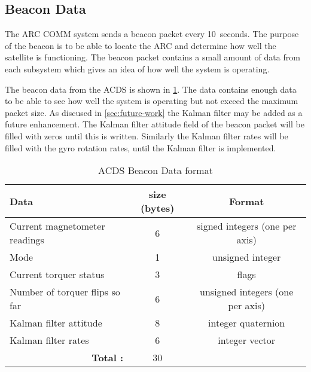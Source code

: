 \subsection{Beacon Data}

The \ac{ARC} \ac{COMM} system sends a beacon packet every 10~seconds. The purpose of the beacon is to be able to locate the \ac{ARC} and determine how well the satellite is functioning. The beacon packet contains a small amount of data from each subsystem which gives an idea of how well the system is operating.

The beacon data from the \ac{ACDS} is shown in \cref{tab:beacondat}. The data contains enough data to be able to see how well the system is operating but not exceed the maximum packet size. As discused in \cref{sec:future-work} the Kalman filter may be added as a future enhancement. The Kalman filter attitude field of the beacon packet will be filled with zeros until this is written. Similarly the Kalman filter rates will be filled with the gyro rotation rates, until the Kalman filter is implemented.

\begin{table}[htb]
    \centering
    \caption{\ac{ACDS} Beacon Data format}
    \label{tab:beacondat}
    \begin{tabular}{|l|c|c|}
        \hline
        Data&size (bytes)&Format\\
        \hline
        Current magnetometer readings&6&signed integers (one per axis)\\
        \hline
        Mode&1&unsigned integer\\
        \hline
        Current torquer status&3&flags\\
        \hline
        Number of torquer flips so far & 6 & unsigned integers (one per axis)\\
        \hline
        Kalman filter attitude&8&integer quaternion\\
        \hline
        Kalman filter rates&6&integer vector\\
        \hline
        \multicolumn{1}{|r|}{\bfseries Total :}&30&\\
        \hline
    \end{tabular}
\end{table}

